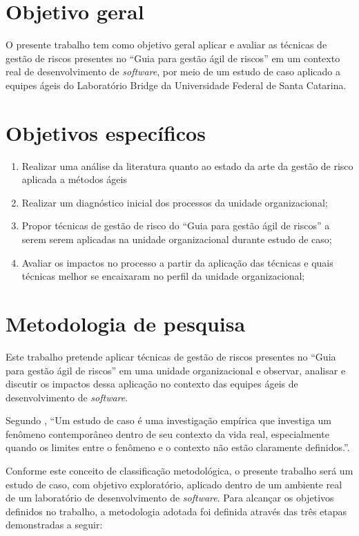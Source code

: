 \documentclass[
    12pt,       %
    openright,      %
    twoside,      %
    a4paper,      %
    english,      %
    french,       %
    spanish,      %
    brazil,       %
    ]{abntex2}
\begin{document}
\section{Objetivo geral}

O presente trabalho tem como objetivo geral aplicar e avaliar as técnicas de gestão de riscos presentes no “Guia para gestão ágil de riscos” \cite{Vieira:2020} em um contexto real de desenvolvimento de \textit{software}, por meio de um estudo de caso aplicado a equipes ágeis do Laboratório Bridge da Universidade Federal de Santa Catarina.

\section{Objetivos específicos}
\begin{enumerate}
     \item Realizar uma análise da literatura quanto ao estado da arte da gestão de risco aplicada a métodos ágeis
    \item Realizar um diagnóstico inicial dos processos da unidade organizacional;
    \item Propor técnicas de gestão de risco do “Guia para gestão ágil de riscos” \cite{Vieira:2020} a serem serem aplicadas na unidade organizacional durante estudo de caso;
    \item Avaliar os impactos no processo a partir da aplicação das técnicas e quais técnicas melhor se encaixaram no perfil da unidade organizacional;
\end{enumerate}

\section{Metodologia de pesquisa}

Este trabalho pretende aplicar técnicas de gestão de riscos presentes no “Guia para gestão ágil de riscos”  \cite{Vieira:2020} em uma unidade organizacional e observar, analisar e discutir os impactos dessa aplicação no contexto das equipes ágeis de desenvolvimento de \textit{software}.

Segundo , “Um estudo de caso é uma investigação empírica que investiga um fenômeno contemporâneo dentro de seu contexto da vida real, especialmente quando os limites entre o fenômeno e o contexto não estão claramente
definidos.”. 

Conforme este conceito de classificação metodológica, o presente trabalho será um estudo de caso, com objetivo exploratório, aplicado dentro de um ambiente real de um laboratório de desenvolvimento de \textit{software}. Para alcançar os objetivos definidos no trabalho, a metodologia adotada foi definida através das três etapas demonstradas a seguir: 
\end{document}
